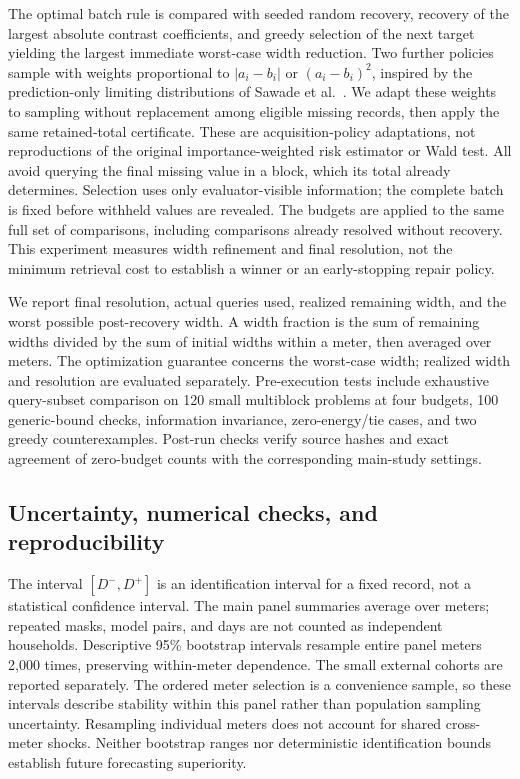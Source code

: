 The optimal batch rule is compared with seeded random recovery, recovery
of the largest absolute contrast coefficients, and greedy selection of the
next target yielding the largest immediate worst-case width reduction.
Two further policies sample with weights proportional to $|a_i-b_i|$ or
$(a_i-b_i)^2$, inspired by the prediction-only limiting distributions of
Sawade et al.\ \citep{sawade}. We adapt these weights to sampling without
replacement among eligible missing records, then apply the same retained-total
certificate. These are acquisition-policy adaptations, not reproductions
of the original importance-weighted risk estimator or Wald test.
All avoid querying the final missing value in a block, which its total
already determines. Selection uses only evaluator-visible information;
the complete batch is fixed before withheld values are revealed.
The budgets are applied to the same full set of comparisons, including
comparisons already resolved without recovery. This experiment measures
width refinement and final resolution, not the minimum retrieval cost to
establish a winner or an early-stopping repair policy.

We report final resolution, actual queries used, realized remaining width,
and the worst possible post-recovery width. A width fraction is the sum of
remaining widths divided by the sum of initial widths within a meter,
then averaged over meters. The optimization guarantee concerns the
worst-case width; realized width and resolution are evaluated separately.
Pre-execution tests include exhaustive query-subset comparison on 120
small multiblock problems at four budgets, 100 generic-bound checks,
information invariance, zero-energy/tie cases, and two greedy counterexamples.
Post-run checks verify source hashes and exact agreement of zero-budget
counts with the corresponding main-study settings.



\subsection{Uncertainty, numerical checks, and reproducibility}
The interval $[D^-,D^+]$ is an identification interval for a fixed record,
not a statistical confidence interval. The main panel summaries average
over meters; repeated masks, model pairs, and days are not counted as
independent households. Descriptive 95\% bootstrap intervals resample
entire panel meters 2,000 times, preserving within-meter dependence. The
small external cohorts are reported separately. The ordered meter selection
is a convenience sample, so these intervals describe stability within this
panel rather than population sampling uncertainty. Resampling individual
meters does not account for shared cross-meter shocks. Neither bootstrap ranges
nor deterministic identification bounds establish future forecasting
superiority.

